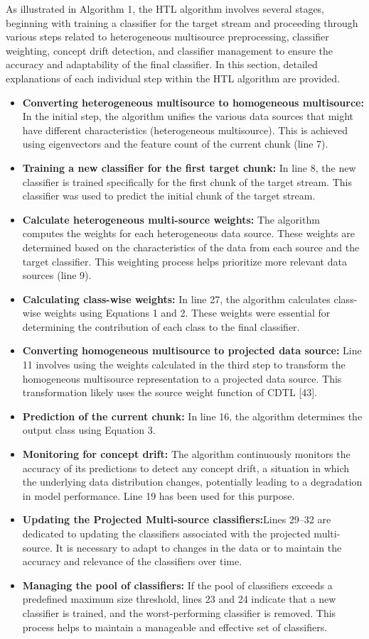 As illustrated in Algorithm 1, the HTL algorithm involves several stages, beginning with training a classifier for the target stream and proceeding through various steps related to heterogeneous multisource preprocessing, classifier weighting, concept drift detection, and classifier management to ensure the accuracy and adaptability of the final classifier. In this section, detailed explanations of each individual step within the HTL algorithm are provided.
\begin{itemize}
	\item \textbf{Converting heterogeneous multisource to homogeneous multisource:} In the initial step, the algorithm unifies the various data sources that might have different characteristics (heterogeneous multisource). This is achieved using eigenvectors and the feature count of the current chunk (line 7).
	\item \textbf{Training a new classifier for the first target chunk:} In line 8, the new classifier is trained specifically for the first chunk of the target stream. This classifier was used to predict the initial chunk of the target stream.
	\item \textbf{Calculate heterogeneous multi-source weights:} The algorithm computes the weights for each heterogeneous data source. These weights are determined based on the characteristics of the data from each source and the target classifier. This weighting process helps prioritize more relevant data sources (line 9).
	\item \textbf{Calculating class-wise weights:} In line 27, the algorithm calculates class-wise weights using Equations 1 and 2. These weights were essential for determining the contribution of each class to the final classifier.
	\item \textbf{Converting homogeneous multisource to projected data source:} Line 11 involves using the weights calculated in the third step to transform the homogeneous multisource representation to a projected data source. This transformation likely uses the source weight function of CDTL [43].
	\item \textbf{Prediction of the current chunk:} In line 16, the algorithm determines the output class using Equation 3.
	\item \textbf{Monitoring for concept drift:} The algorithm continuously monitors the accuracy of its predictions to detect any concept drift, a situation in which the underlying data distribution changes, potentially leading to a degradation in model performance. Line 19 has been used for this purpose.
	\item \textbf{Updating the Projected Multi-source classifiers:}Lines 29–32 are dedicated to updating the classifiers associated with the projected multi-source. It is necessary to adapt to changes in the data or to maintain the accuracy and relevance of the classifiers over time.
	\item \textbf{Managing the pool of classifiers:} If the pool of classifiers exceeds a predefined maximum size threshold, lines 23 and 24 indicate that a new classifier is trained, and the worst-performing classifier is removed. This process helps to maintain a manageable and effective set of classifiers.
\end{itemize}
